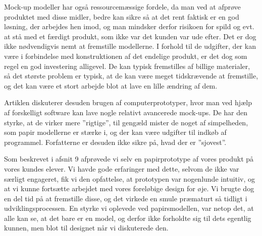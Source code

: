 \documentclass[10pt,a4paper,danish]{article}
\begin{document}
Mock-up modeller har også ressourcemæssige fordele, da man ved at afprøve produktet med disse midler, bedre kan sikre så at det rent faktisk er en god løsning, der arbejdes hen imod, og man mindsker derfor risikoen for spild og evt. at stå med et færdigt produkt, som ikke var det kunden var ude efter. Det er dog ikke nødvendigvis nemt at fremstille modellerne. I forhold til de udgifter, der kan være i forbindelse med konstruktionen af det endelige produkt, er det dog som regel en god investering alligevel. De kan typisk fremstilles af billige materialer, så det største problem er typisk, at de kan være meget tidskrævende at fremstille, og det kan være et stort arbejde blot at lave en lille ændring af dem. 

Artiklen diskuterer desuden brugen af computerprototyper, hvor man ved hjælp af forskelligt software kan lave nogle relativt avancerede mock-ups. De har den styrke, at de virker mere ”rigtige”, til gengæld mister de noget af simpelheden, som papir modellerne er stærke i, og der kan være udgifter til indkøb af programmel. Forfatterne er desuden ikke sikre på, hvad der er ”sjovest”.

Som beskrevet i afsnit 9 afprøvede vi selv en papirprototype af vores produkt på vores kundes elever. Vi havde gode erfaringer med dette, selvom de ikke var særligt engageret, fik vi den opfattelse, at prototypen var nogenlunde intuitiv, og at vi kunne fortsætte arbejdet med vores foreløbige design for øje. Vi brugte dog en del tid på at fremstille disse, og det virkede en smule præmaturt så tidligt i udviklingsprocessen. En styrke vi oplevede ved papirsmodellen, var netop det, at alle kan se, at det bare er en model, og derfor ikke forholdte sig til dets egentlig kunnen, men blot til designet når vi diskuterede den.
\end{document}
